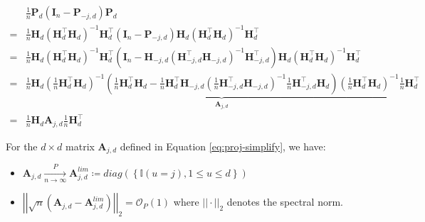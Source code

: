 \documentclass[10pt,a4paper]{amsart}
\newcommand{\bA}{\boldsymbol{A}}
\newcommand{\bH}{\boldsymbol{H}}
\newcommand{\bI}{\boldsymbol{I}}
\newcommand{\bP}{\boldsymbol{P}}
\newcommand{\bigo}{\mathcal{O}}
\newcommand{\pnlim}{\xrightarrow[n \to \infty]{P}}
\begin{document}
\begin{equation}\label{eq:proj-simplify}
    \begin{split}
        & \frac{1}{n}\bP_d(\bI_n - \bP_{-j,d})\bP_d\\
        = & \frac{1}{n}\bH_{d}\left(\bH_{d}^\top\bH_{d}\right)^{-1}\bH_{d}^\top(\bI_n - \bP_{-j,d})\bH_{d}\left(\bH_{d}^\top\bH_{d}\right)^{-1}\bH_{d}^\top\\
        = & \frac{1}{n}\bH_{d}\left(\bH_{d}^\top\bH_{d}\right)^{-1}\bH_{d}^\top\left(\bI_n - \bH_{-j,d}\left(\bH_{-j,d}^\top\bH_{-j,d}\right)^{-1}\bH_{-j,d}^\top\right)\bH_{d}\left(\bH_{d}^\top\bH_{d}\right)^{-1}\bH_{d}^\top\\
        = & \frac{1}{n}\bH_{d}\underbrace{\left(\frac{1}{n}\bH_{d}^\top\bH_{d}\right)^{-1}\left(\frac{1}{n}\bH_{d}^\top\bH_{d} - \frac{1}{n}\bH_{d}^\top\bH_{-j,d}\left(\frac{1}{n}\bH_{-j,d}^\top\bH_{-j,d}\right)^{-1}\frac{1}{n}\bH_{-j,d}^\top\bH_{d}\right)\left(\frac{1}{n}\bH_{d}^\top\bH_{d}\right)^{-1}}_{\bA_{j,d}}\frac{1}{n}\bH_{d}^\top\\
        = &  \frac{1}{n}\bH_{d} \bA_{j,d}\frac{1}{n}\bH_{d}^\top
    \end{split}
\end{equation}

\begin{lemma}\label{lem:A-lim}
    For the $d \times d$ matrix $\bA_{j,d}$ defined in Equation \ref{eq:proj-simplify}, we have:
    \begin{itemize}
        \item $\bA_{j,d} \pnlim \bA^{lim}_{j,d}\coloneqq diag(\left\{\mathbb{I}(u = j), 1 \leq u \leq d\right\})$
        \item $\left|\left|\sqrt{n}\left(\bA_{j,d} - \bA^{lim}_{j,d}\right)\right|\right|_2 = \bigo_P(1)$ where $||\cdot||_2$ denotes the spectral norm.
    \end{itemize}
\end{lemma}
\end{document}
